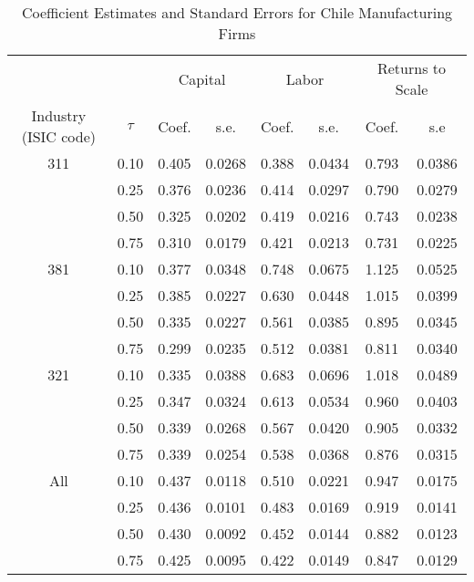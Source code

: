 \begin{table}[ht]
\centering
\caption{Coefficient Estimates and Standard Errors for Chile Manufacturing Firms} 
\begin{tabular}{cccccccc}
  \hline\hline & & \multicolumn{2}{c}{Capital}  & \multicolumn{2}{c}{Labor} & \multicolumn{2}{c}{Returns to Scale} \\ \cmidrule(lr){3-4} \cmidrule(lr){5-6} \cmidrule(lr){7-8}Industry (ISIC code) & $\tau$ & Coef. & s.e. & Coef. & s.e. & Coef. & s.e \\ 
  \hline
311 & 0.10 & 0.405 & 0.0268 & 0.388 & 0.0434 & 0.793 & 0.0386 \\ 
   & 0.25 & 0.376 & 0.0236 & 0.414 & 0.0297 & 0.790 & 0.0279 \\ 
   & 0.50 & 0.325 & 0.0202 & 0.419 & 0.0216 & 0.743 & 0.0238 \\ 
   & 0.75 & 0.310 & 0.0179 & 0.421 & 0.0213 & 0.731 & 0.0225 \\ 
  381 & 0.10 & 0.377 & 0.0348 & 0.748 & 0.0675 & 1.125 & 0.0525 \\ 
   & 0.25 & 0.385 & 0.0227 & 0.630 & 0.0448 & 1.015 & 0.0399 \\ 
   & 0.50 & 0.335 & 0.0227 & 0.561 & 0.0385 & 0.895 & 0.0345 \\ 
   & 0.75 & 0.299 & 0.0235 & 0.512 & 0.0381 & 0.811 & 0.0340 \\ 
  321 & 0.10 & 0.335 & 0.0388 & 0.683 & 0.0696 & 1.018 & 0.0489 \\ 
   & 0.25 & 0.347 & 0.0324 & 0.613 & 0.0534 & 0.960 & 0.0403 \\ 
   & 0.50 & 0.339 & 0.0268 & 0.567 & 0.0420 & 0.905 & 0.0332 \\ 
   & 0.75 & 0.339 & 0.0254 & 0.538 & 0.0368 & 0.876 & 0.0315 \\ 
  All & 0.10 & 0.437 & 0.0118 & 0.510 & 0.0221 & 0.947 & 0.0175 \\ 
   & 0.25 & 0.436 & 0.0101 & 0.483 & 0.0169 & 0.919 & 0.0141 \\ 
   & 0.50 & 0.430 & 0.0092 & 0.452 & 0.0144 & 0.882 & 0.0123 \\ 
   & 0.75 & 0.425 & 0.0095 & 0.422 & 0.0149 & 0.847 & 0.0129 \\ 
   \hline
\end{tabular}
\end{table}
